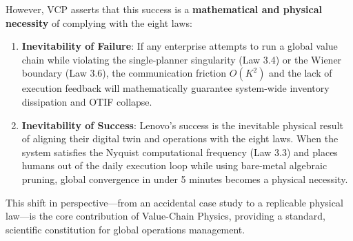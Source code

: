 \documentclass[11pt,a4paper]{article}
\begin{document}
However, VCP asserts that this success is a \textbf{mathematical and physical necessity} of complying with the eight laws:
\begin{enumerate}
    \item \textbf{Inevitability of Failure}: If any enterprise attempts to run a global value chain while violating the single-planner singularity (Law 3.4) or the Wiener boundary (Law 3.6), the communication friction $O(K^2)$ and the lack of execution feedback will mathematically guarantee system-wide inventory dissipation and OTIF collapse.
    \item \textbf{Inevitability of Success}: Lenovo's success is the inevitable physical result of aligning their digital twin and operations with the eight laws. When the system satisfies the Nyquist computational frequency (Law 3.3) and places humans out of the daily execution loop while using bare-metal algebraic pruning, global convergence in under 5 minutes becomes a physical necessity.
\end{enumerate}

This shift in perspective—from an accidental case study to a replicable physical law—is the core contribution of Value-Chain Physics, providing a standard, scientific constitution for global operations management.
\end{document}
